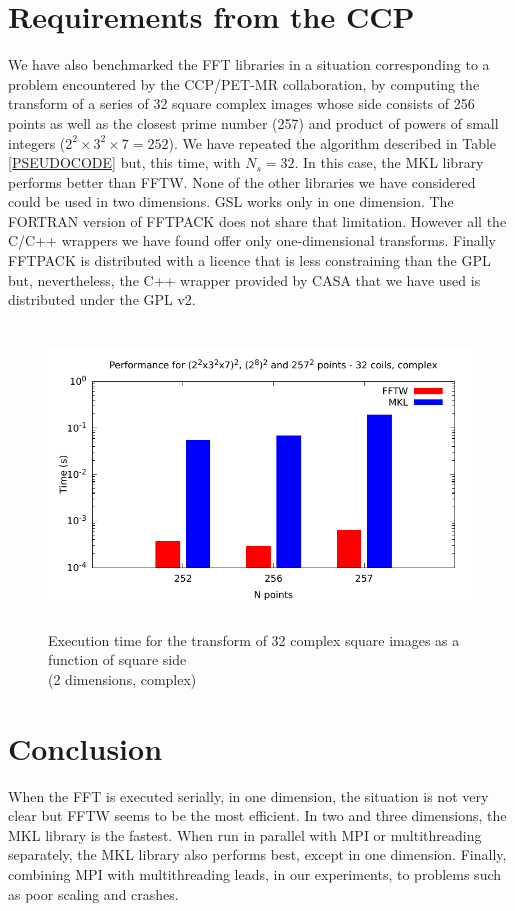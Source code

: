\documentclass[12pt, a4paper]{article} \setlength{\textheight}{24cm}
\begin{document}
\section{Requirements from the CCP}\label{CCPPETMR}
We have also benchmarked the FFT libraries in a situation
corresponding to a problem encountered by the CCP/PET-MR
collaboration, by computing the transform of a series of 32 square
complex images whose side consists of 256 points as well as the
closest prime number (257) and product of powers of small integers
($2^2\times 3^2\times 7=252$). We have repeated the algorithm
described in Table \ref{PSEUDOCODE} but, this time, with $N_s=32$. In
this case, the MKL library performs better than FFTW. None of the
other libraries we have considered could be used in two dimensions.
GSL works only in one dimension. The FORTRAN version of FFTPACK does
not share that limitation. However all the C/C++ wrappers we have
found offer only one-dimensional transforms. Finally FFTPACK is
distributed with a licence that is less constraining than the GPL but,
nevertheless, the C++ wrapper provided by CASA that we have used is
distributed under the GPL v2.

\begin{figure}[H]
  \centering
  \includegraphics[height=8cm]{graphs/ccppetmr.pdf}
  \caption{Execution time for the transform of 32 complex square
    images as a function of square side\\(2 dimensions, complex)}
  \label{method}
\end{figure}
\section{Conclusion}
When the FFT is executed serially, in one dimension, the situation is
not very clear but FFTW seems to be the most efficient. In two and
three dimensions, the MKL library is the fastest. When run in parallel
with MPI or multithreading separately, the MKL library also performs
best, except in one dimension. Finally, combining MPI with
multithreading leads, in our experiments, to problems such as poor
scaling and crashes.
\end{document}
